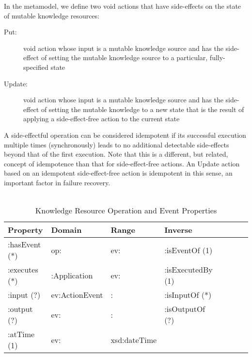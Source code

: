 \documentclass[runningheads]{llncs}
\begin{document}
In the metamodel, we define two void actions that have side-effects on the state of mutable knowledge resources:
  \begin{description}
    \item[Put:] void action whose input is a mutable knowledge source and has the side-effect of setting the mutable knowledge source to a particular, fully-specified state
    \item[Update:] void action whose input is a mutable knowledge source and has the side-effect of setting the mutable knowledge to a new state that is the result of applying a side-effect-free action to the current state
  \end{description}
  
  A side-effectful operation can be considered idempotent if its successful execution multiple times (synchronously) leads to no additional detectable side-effects beyond that of the first execution. Note that this is a different, but related, concept of idempotence than that for side-effect-free actions. An Update action based on an idempotent side-effect-free action is idempotent in this sense, an important factor in failure recovery.\\
\\
\begin{table}[h]
\centering
\begin{tabular}{|l|l|l|l|l|l|l|l|}
\hline
\textbf{Property}  &\textbf{Domain}  & \textbf{Range}  & \textbf{Inverse}
\\ \hline
:hasEvent (*)      & op:               & ev:             & :isEventOf  (1)         \\ \hline
:executes (*)      & :Application      & ev:             & :isExecutedBy  (1)         \\ \hline
:input (?)         & ev:ActionEvent    &    :          & :isInputOf  (*)         \\ \hline
:output (?)        & ev:               &    :          & :isOutputOf  (?)         \\ \hline
:atTime (1)        & ev:               &    xsd:dateTime          &          \\ \hline
\end{tabular}
\caption{Knowledge Resource Operation and Event Properties}
\vspace{-0.3cm}
\label{kropprop}
\end{table}

\vspace{-0.8cm}
\end{document}
